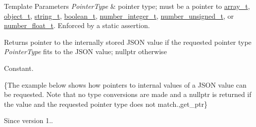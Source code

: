 \begin{DoxyTemplParams}{Template Parameters}
{\em Pointer\+Type} & pointer type; must be a pointer to \hyperlink{classnlohmann_1_1basic__json_a4c409f1b6d9caf3412c78af9a5883fed}{array\+\_\+t}, \hyperlink{classnlohmann_1_1basic__json_a0322396ca5cd4623bc816bf735377623}{object\+\_\+t}, \hyperlink{classnlohmann_1_1basic__json_a61f8566a1a85a424c7266fb531dca005}{string\+\_\+t}, \hyperlink{classnlohmann_1_1basic__json_a4c919102a9b4fe0d588af64801436082}{boolean\+\_\+t}, \hyperlink{classnlohmann_1_1basic__json_a98e611d67b7bd75307de99c9358ab2dc}{number\+\_\+integer\+\_\+t}, \hyperlink{classnlohmann_1_1basic__json_ab906e29b5d83ac162e823ada2156b989}{number\+\_\+unsigned\+\_\+t}, or \hyperlink{classnlohmann_1_1basic__json_a88d6103cb3620410b35200ee8e313d97}{number\+\_\+float\+\_\+t}. Enforced by a static assertion.\\
\hline
\end{DoxyTemplParams}
\begin{DoxyReturn}{Returns}
pointer to the internally stored J\+S\+ON value if the requested pointer type {\itshape Pointer\+Type} fits to the J\+S\+ON value; {\ttfamily nullptr} otherwise
\end{DoxyReturn}
Constant.

\{The example below shows how pointers to internal values of a J\+S\+ON value can be requested. Note that no type conversions are made and a {\ttfamily nullptr} is returned if the value and the requested pointer type does not match.,get\+\_\+ptr\}

\begin{DoxySince}{Since}
version 1.. 
\end{DoxySince}
